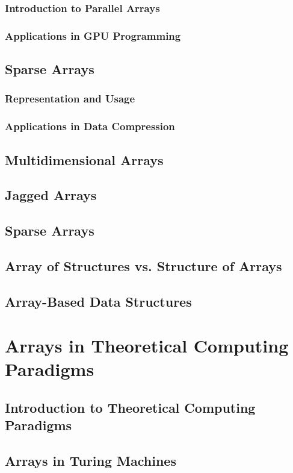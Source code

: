 \documentclass[12pt, oneside]{book}
\begin{document}
	\subsection{Introduction to Parallel Arrays}
	\subsection{Applications in GPU Programming}
	
	\section{Sparse Arrays}
	\subsection{Representation and Usage}
	\subsection{Applications in Data Compression}
	\section{Multidimensional Arrays}
	\section{Jagged Arrays}
	\section{Sparse Arrays}
	\section{Array of Structures vs. Structure of Arrays}
	\section{Array-Based Data Structures}
	
	\chapter{Arrays in Theoretical Computing Paradigms}
	
	\section{Introduction to Theoretical Computing Paradigms}
	\section{Arrays in Turing Machines}
\end{document}
